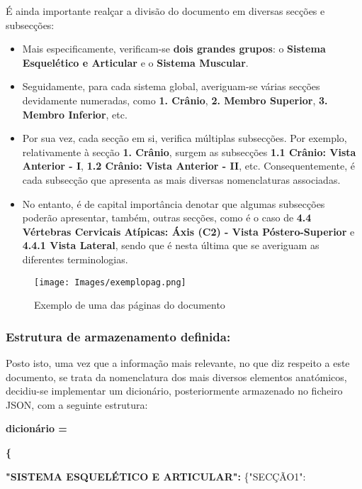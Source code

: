 É ainda importante realçar a divisão do documento em diversas secções e subsecções:
\begin{itemize}
    \item Mais especificamente, verificam-se \textbf{dois grandes grupos}: o \textbf{Sistema Esquelético e Articular} e o \textbf{Sistema Muscular}.

    \item Seguidamente, para cada sistema global, averiguam-se várias secções devidamente numeradas, como \textbf{1. Crânio}, \textbf{2. Membro Superior}, \textbf{3. Membro Inferior}, etc.

    \item Por sua vez, cada secção em si, verifica múltiplas subsecções. Por exemplo, relativamente à secção \textbf{1. Crânio}, surgem as subsecções \textbf{1.1 Crânio: Vista Anterior - I}, \textbf{1.2 Crânio: Vista Anterior - II}, etc. Consequentemente, é cada subsecção que apresenta as mais diversas nomenclaturas associadas.

    \item No entanto, é de capital importância denotar que algumas subsecções poderão apresentar, também, outras secções, como é o caso de \textbf{4.4 Vértebras Cervicais Atípicas: Áxis (C2) - Vista Póstero-Superior} e 
    \textbf{4.4.1 Vista Lateral}, sendo que é nesta última que se averiguam as diferentes terminologias.

\end{itemize}
 
\begin{figure}[H]
    \centering
    \centering
    \texttt{[image: Images/exemplopag.png]}
    \caption{Exemplo de uma das páginas do documento}
    \label{fig:exemplopag}
\end{figure}

\subsubsection{Estrutura de armazenamento definida:}

Posto isto, uma vez que a informação mais relevante, no que diz respeito a este documento, se trata da nomenclatura dos mais diversos elementos anatómicos, decidiu-se implementar um dicionário, posteriormente armazenado no ficheiro JSON, com a seguinte estrutura:

\begin{center}
    \textbf{dicionário =}
\end{center}
\textbf{\{}
\begin{center}
    \textbf{"SISTEMA ESQUELÉTICO E ARTICULAR":}
    \{"SECÇÃO1":
\end{center}

